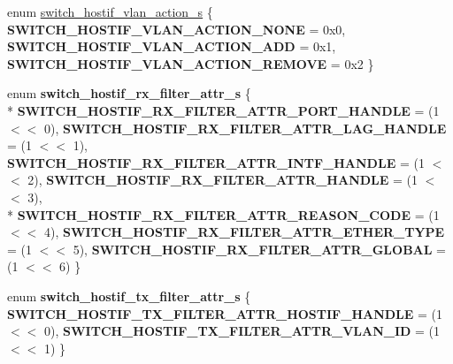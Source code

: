 \begin{DoxyCompactItemize}
\item 
enum \hyperlink{group__HostInterface_ga0986f09d2454602d51b3051c139a2f6f}{switch\+\_\+hostif\+\_\+vlan\+\_\+action\+\_\+s} \{ {\bfseries S\+W\+I\+T\+C\+H\+\_\+\+H\+O\+S\+T\+I\+F\+\_\+\+V\+L\+A\+N\+\_\+\+A\+C\+T\+I\+O\+N\+\_\+\+N\+O\+N\+E} = 0x0, 
{\bfseries S\+W\+I\+T\+C\+H\+\_\+\+H\+O\+S\+T\+I\+F\+\_\+\+V\+L\+A\+N\+\_\+\+A\+C\+T\+I\+O\+N\+\_\+\+A\+D\+D} = 0x1, 
{\bfseries S\+W\+I\+T\+C\+H\+\_\+\+H\+O\+S\+T\+I\+F\+\_\+\+V\+L\+A\+N\+\_\+\+A\+C\+T\+I\+O\+N\+\_\+\+R\+E\+M\+O\+V\+E} = 0x2
 \}
\item 
\hypertarget{group__HostInterface_gaae20631e30094c4d344a96c98673c6cb}{enum {\bfseries switch\+\_\+hostif\+\_\+rx\+\_\+filter\+\_\+attr\+\_\+s} \{ \\*
{\bfseries S\+W\+I\+T\+C\+H\+\_\+\+H\+O\+S\+T\+I\+F\+\_\+\+R\+X\+\_\+\+F\+I\+L\+T\+E\+R\+\_\+\+A\+T\+T\+R\+\_\+\+P\+O\+R\+T\+\_\+\+H\+A\+N\+D\+L\+E} = (1 $<$$<$ 0), 
{\bfseries S\+W\+I\+T\+C\+H\+\_\+\+H\+O\+S\+T\+I\+F\+\_\+\+R\+X\+\_\+\+F\+I\+L\+T\+E\+R\+\_\+\+A\+T\+T\+R\+\_\+\+L\+A\+G\+\_\+\+H\+A\+N\+D\+L\+E} = (1 $<$$<$ 1), 
{\bfseries S\+W\+I\+T\+C\+H\+\_\+\+H\+O\+S\+T\+I\+F\+\_\+\+R\+X\+\_\+\+F\+I\+L\+T\+E\+R\+\_\+\+A\+T\+T\+R\+\_\+\+I\+N\+T\+F\+\_\+\+H\+A\+N\+D\+L\+E} = (1 $<$$<$ 2), 
{\bfseries S\+W\+I\+T\+C\+H\+\_\+\+H\+O\+S\+T\+I\+F\+\_\+\+R\+X\+\_\+\+F\+I\+L\+T\+E\+R\+\_\+\+A\+T\+T\+R\+\_\+\+H\+A\+N\+D\+L\+E} = (1 $<$$<$ 3), 
\\*
{\bfseries S\+W\+I\+T\+C\+H\+\_\+\+H\+O\+S\+T\+I\+F\+\_\+\+R\+X\+\_\+\+F\+I\+L\+T\+E\+R\+\_\+\+A\+T\+T\+R\+\_\+\+R\+E\+A\+S\+O\+N\+\_\+\+C\+O\+D\+E} = (1 $<$$<$ 4), 
{\bfseries S\+W\+I\+T\+C\+H\+\_\+\+H\+O\+S\+T\+I\+F\+\_\+\+R\+X\+\_\+\+F\+I\+L\+T\+E\+R\+\_\+\+A\+T\+T\+R\+\_\+\+E\+T\+H\+E\+R\+\_\+\+T\+Y\+P\+E} = (1 $<$$<$ 5), 
{\bfseries S\+W\+I\+T\+C\+H\+\_\+\+H\+O\+S\+T\+I\+F\+\_\+\+R\+X\+\_\+\+F\+I\+L\+T\+E\+R\+\_\+\+A\+T\+T\+R\+\_\+\+G\+L\+O\+B\+A\+L} = (1 $<$$<$ 6)
 \}}\label{group__HostInterface_gaae20631e30094c4d344a96c98673c6cb}

\item 
\hypertarget{group__HostInterface_gab7d97f894a9ffb9e8121021de6bd99bf}{enum {\bfseries switch\+\_\+hostif\+\_\+tx\+\_\+filter\+\_\+attr\+\_\+s} \{ {\bfseries S\+W\+I\+T\+C\+H\+\_\+\+H\+O\+S\+T\+I\+F\+\_\+\+T\+X\+\_\+\+F\+I\+L\+T\+E\+R\+\_\+\+A\+T\+T\+R\+\_\+\+H\+O\+S\+T\+I\+F\+\_\+\+H\+A\+N\+D\+L\+E} = (1 $<$$<$ 0), 
{\bfseries S\+W\+I\+T\+C\+H\+\_\+\+H\+O\+S\+T\+I\+F\+\_\+\+T\+X\+\_\+\+F\+I\+L\+T\+E\+R\+\_\+\+A\+T\+T\+R\+\_\+\+V\+L\+A\+N\+\_\+\+I\+D} = (1 $<$$<$ 1)
 \}}\label{group__HostInterface_gab7d97f894a9ffb9e8121021de6bd99bf}


\end{DoxyCompactItemize}
